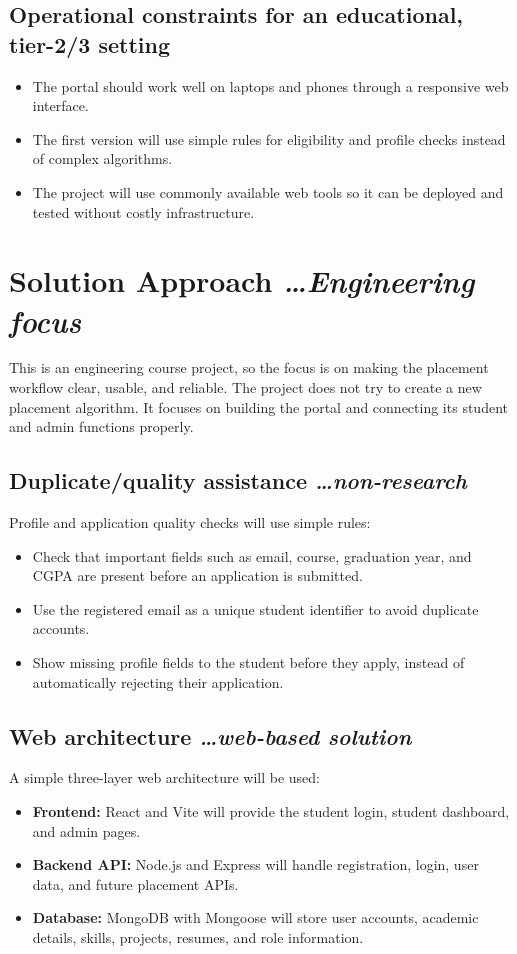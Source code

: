\documentclass[11pt,a4paper]{article}
\newcommand{\BvrHint}[1]{{\normalfont\normalsize\itshape\hfill #1}}
\begin{document}
\subsection{Operational constraints for an educational, tier-2/3 setting}
\begin{itemize}[leftmargin=0.7cm]
  \item The portal should work well on laptops and phones through a responsive web interface.
  \item The first version will use simple rules for eligibility and profile checks instead of complex algorithms.
  \item The project will use commonly available web tools so it can be deployed and tested without costly infrastructure.
\end{itemize}

\section{Solution Approach \BvrHint{\ldots Engineering focus}}
This is an engineering course project, so the focus is on making the placement workflow clear, usable, and reliable. The project does not try to create a new placement algorithm. It focuses on building the portal and connecting its student and admin functions properly.

\subsection{Duplicate/quality assistance \BvrHint{\ldots non-research}}
Profile and application quality checks will use simple rules:
\begin{itemize}[leftmargin=0.7cm]
  \item Check that important fields such as email, course, graduation year, and CGPA are present before an application is submitted.
  \item Use the registered email as a unique student identifier to avoid duplicate accounts.
  \item Show missing profile fields to the student before they apply, instead of automatically rejecting their application.
\end{itemize}

\subsection{Web architecture \BvrHint{\ldots web-based solution}}
A simple three-layer web architecture will be used:
\begin{itemize}[leftmargin=0.7cm]
  \item \textbf{Frontend:} React and Vite will provide the student login, student dashboard, and admin pages.
  \item \textbf{Backend API:} Node.js and Express will handle registration, login, user data, and future placement APIs.
  \item \textbf{Database:} MongoDB with Mongoose will store user accounts, academic details, skills, projects, resumes, and role information.
\end{itemize}
\end{document}
